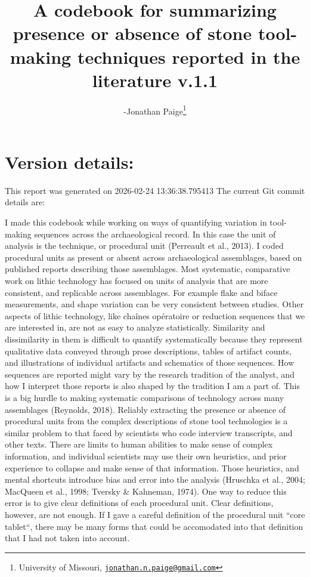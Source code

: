\documentclass[
]{article}
\title{A codebook for summarizing presence or absence of stone
tool-making techniques reported in the literature v.1.1}
\author{-Jonathan Paige\footnote{University of Missouri,
  \href{mailto:jonathan.n.paige@gmail.com}{\nolinkurl{jonathan.n.paige@gmail.com}}}}
\date{}
\begin{document}
\maketitle

{
\setcounter{tocdepth}{3}
\tableofcontents
}
\section{Version details:}\label{version-details}

This report was generated on 2026-02-24 13:36:38.795413 The current Git
commit details are:

I made this codebook while working on ways of quantifying variation in
tool-making sequences across the archaeological record. In this case the
unit of analysis is the technique, or procedural unit (Perreault et al.,
2013). I coded procedural units as present or absent across
archaeological assemblages, based on published reports describing those
assemblages. Most systematic, comparative work on lithic technology has
focused on units of analysis that are more consistent, and replicable
across assemblages. For example flake and biface measurements, and shape
variation can be very consistent between studies. Other aspects of
lithic technology, like chaînes opératoire or reduction sequences that
we are interested in, are not as easy to analyze statistically.
Similarity and dissimilarity in them is difficult to quantify
systematically because they represent qualitative data conveyed through
prose descriptions, tables of artifact counts, and illustrations of
individual artifacts and schematics of those sequences. How sequences
are reported might vary by the research tradition of the analyst, and
how I interpret those reports is also shaped by the tradition I am a
part of. This is a big hurdle to making systematic comparisons of
technology across many assemblages (Reynolds, 2018). Reliably extracting
the presence or absence of procedural units from the complex
descriptions of stone tool technologies is a similar problem to that
faced by scientists who code interview transcripts, and other texts.
There are limits to human abilities to make sense of complex
information, and individual scientists may use their own heuristics, and
prior experience to collapse and make sense of that information. Those
heuristics, and mental shortcuts introduce bias and error into the
analysis (Hruschka et al., 2004; MacQueen et al., 1998; Tversky \&
Kahneman, 1974). One way to reduce this error is to give clear
definitions of each procedural unit. Clear definitions, however, are not
enough. If I gave a careful definition of the procedural unit ``core
tablet``, there may be many forms that could be accomodated into that
definition that I had not taken into account.
\end{document}
